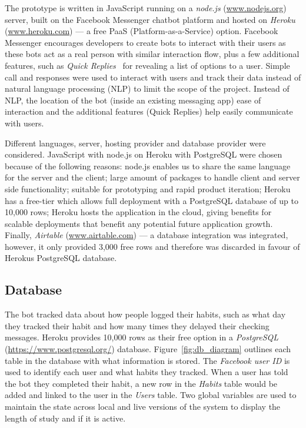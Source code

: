The prototype is written in JavaScript running on a \textit{node.js} (\url{www.nodejs.org}) server, built on the Facebook Messenger chatbot platform and hosted on \textit{Heroku} (\url{www.heroku.com}) --- a free PaaS (Platform-as-a-Service) option. Facebook Messenger encourages developers to create bots to interact with their users as these bots act as a real person with similar interaction flow, plus a few additional features, such as \textit{Quick Replies}~\cite{doc_fb_quick_replies} for revealing a list of options to a user. Simple call and responses were used to interact with users and track their data instead of natural language processing (NLP) to limit the scope of the project. Instead of NLP, the location of the bot (inside an existing messaging app) ease of interaction and the additional features (Quick Replies) help easily communicate with users.


Different languages, server, hosting provider and database provider were considered. JavaScript with node.js on Heroku with PostgreSQL were chosen because of the following reasons: node.js enables us to share the same language for the server and the client; large amount of packages to handle client and server side functionality; suitable for prototyping and rapid product iteration; Heroku has a free-tier which allows full deployment with a PostgreSQL database of up to 10,000 rows; Heroku hosts the application in the cloud, giving benefits for scalable deployments that benefit any potential future application growth. Finally, \textit{Airtable} (\url{www.airtable.com}) --- a database integration was integrated, however, it only provided 3,000 free rows and therefore was discarded in favour of Herokus PostgreSQL database.


\subsection{Database}
The bot tracked data about how people logged their habits, such as what day they tracked their habit and how many times they delayed their checking messages. Heroku provides 10,000 rows as their free option in a \textit{PostgreSQL} (\url{https://www.postgresql.org/}) database. Figure~\ref{fig:db_diagram} outlines each table in the database with what information is stored. The \textit{Facebook user ID} is used to identify each user and what habits they tracked. When a user has told the bot they completed their habit, a new row in the \textit{Habits} table would be added and linked to the user in the \textit{Users} table. Two global variables are used to maintain the state across local and live versions of the system to display the length of study and if it is active.

